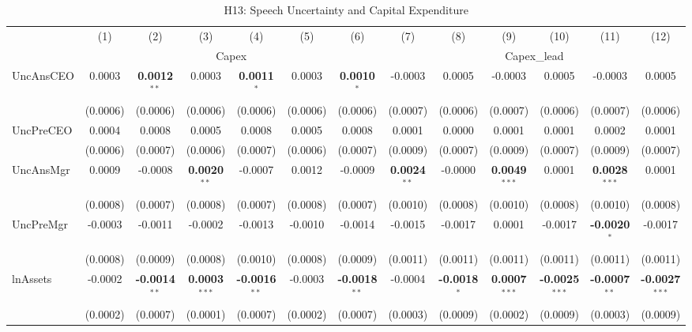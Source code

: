\begin{landscape}
\begin{table}[H]
\setlength{\tabcolsep}{3pt}
\renewcommand{\arraystretch}{0.85}
\centering
\caption{H13: Speech Uncertainty and Capital Expenditure}
\label{tab:h13}
\scriptsize
\begin{tabular}{lcccccccccccc}
\toprule
 & (1) & (2) & (3) & (4) & (5) & (6) & (7) & (8) & (9) & (10) & (11) & (12) \\
 & \multicolumn{6}{c}{Capex} & \multicolumn{6}{c}{Capex\_lead} \\
\cmidrule(lr){2-7} \cmidrule(lr){8-13}
\midrule
UncAnsCEO & 0.0003 & \textbf{0.0012}$^{**}$ & 0.0003 & \textbf{0.0011}$^{*}$ & 0.0003 & \textbf{0.0010}$^{*}$ & -0.0003 & 0.0005 & -0.0003 & 0.0005 & -0.0003 & 0.0005 \\
 & (0.0006) & (0.0006) & (0.0006) & (0.0006) & (0.0006) & (0.0006) & (0.0007) & (0.0006) & (0.0007) & (0.0006) & (0.0007) & (0.0006) \\
UncPreCEO & 0.0004 & 0.0008 & 0.0005 & 0.0008 & 0.0005 & 0.0008 & 0.0001 & 0.0000 & 0.0001 & 0.0001 & 0.0002 & 0.0001 \\
 & (0.0006) & (0.0007) & (0.0006) & (0.0007) & (0.0006) & (0.0007) & (0.0009) & (0.0007) & (0.0009) & (0.0007) & (0.0009) & (0.0007) \\
UncAnsMgr & 0.0009 & -0.0008 & \textbf{0.0020}$^{**}$ & -0.0007 & 0.0012 & -0.0009 & \textbf{0.0024}$^{**}$ & -0.0000 & \textbf{0.0049}$^{***}$ & 0.0001 & \textbf{0.0028}$^{***}$ & 0.0001 \\
 & (0.0008) & (0.0007) & (0.0008) & (0.0007) & (0.0008) & (0.0007) & (0.0010) & (0.0008) & (0.0010) & (0.0008) & (0.0010) & (0.0008) \\
UncPreMgr & -0.0003 & -0.0011 & -0.0002 & -0.0013 & -0.0010 & -0.0014 & -0.0015 & -0.0017 & 0.0001 & -0.0017 & \textbf{-0.0020}$^{*}$ & -0.0017 \\
 & (0.0008) & (0.0009) & (0.0008) & (0.0010) & (0.0008) & (0.0009) & (0.0011) & (0.0011) & (0.0011) & (0.0011) & (0.0011) & (0.0011) \\
\midrule
lnAssets & -0.0002 & \textbf{-0.0014}$^{**}$ & \textbf{0.0003}$^{***}$ & \textbf{-0.0016}$^{**}$ & -0.0003 & \textbf{-0.0018}$^{**}$ & -0.0004 & \textbf{-0.0018}$^{*}$ & \textbf{0.0007}$^{***}$ & \textbf{-0.0025}$^{***}$ & \textbf{-0.0007}$^{**}$ & \textbf{-0.0027}$^{***}$ \\
 & (0.0002) & (0.0007) & (0.0001) & (0.0007) & (0.0002) & (0.0007) & (0.0003) & (0.0009) & (0.0002) & (0.0009) & (0.0003) & (0.0009) \\

\end{tabular}
\end{table}
\end{landscape}

